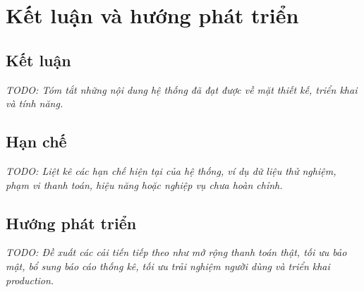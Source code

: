 \section{Kết luận và hướng phát triển}

\subsection{Kết luận}
\textit{TODO: Tóm tắt những nội dung hệ thống đã đạt được về mặt thiết kế, triển khai và tính năng.}

\subsection{Hạn chế}
\textit{TODO: Liệt kê các hạn chế hiện tại của hệ thống, ví dụ dữ liệu thử nghiệm, phạm vi thanh toán, hiệu năng hoặc nghiệp vụ chưa hoàn chỉnh.}

\subsection{Hướng phát triển}
\textit{TODO: Đề xuất các cải tiến tiếp theo như mở rộng thanh toán thật, tối ưu bảo mật, bổ sung báo cáo thống kê, tối ưu trải nghiệm người dùng và triển khai production.}

